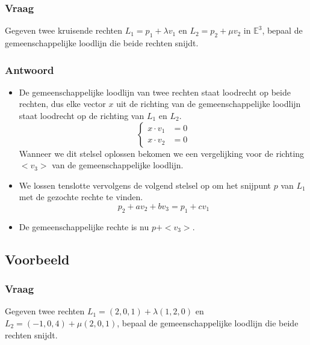 \documentclass[main.tex]{subfiles}
\begin{document}
\subsubsection*{Vraag}
\begin{center}
  Gegeven twee kruisende rechten $L_{1}=p_{1}+\lambda v_{1}$ en $L_{2}=p_{2}+\mu v_{2}$ in $\mathbb{E}^{3}$, bepaal de gemeenschappelijke loodlijn die beide rechten snijdt.
\end{center}

\subsubsection*{Antwoord}
\begin{itemize}
\item
  De gemeenschappelijke loodlijn van twee rechten staat loodrecht op beide rechten, dus elke vector $x$ uit de richting van de gemeenschappelijke loodlijn staat loodrecht op de richting van $L_{1}$ en $L_{2}$.
  \[
  \left\{
    \begin{array}{cc}
      x \cdot v_{1} &= 0\\
      x \cdot v_{2} &= 0
    \end{array}
  \right.
  \]
  Wanneer we dit stelsel oplossen bekomen we een vergelijking voor de richting $<v_{3}>$ van de gemeenschappelijke loodlijn.
\item We lossen tenslotte vervolgens de volgend stelsel op om het snijpunt $p$ van $L_{1}$ met de gezochte rechte te vinden.
  \[ p_{2} + a v_{2} + b v_{3} = p_{1} + c v_{1} \]
\item De gemeenschappelijke rechte is nu $p+<v_{3}>$.
\end{itemize}



\subsection*{Voorbeeld}
\subsubsection*{Vraag}
\begin{center}
  Gegeven twee rechten $L_{1}= (2,0,1) + \lambda(1,2,0)$ en $L_{2}= (-1,0,4) + \mu(2,0,1)$, bepaal de gemeenschappelijke loodlijn die beide rechten snijdt.
\end{center}
\end{document}

